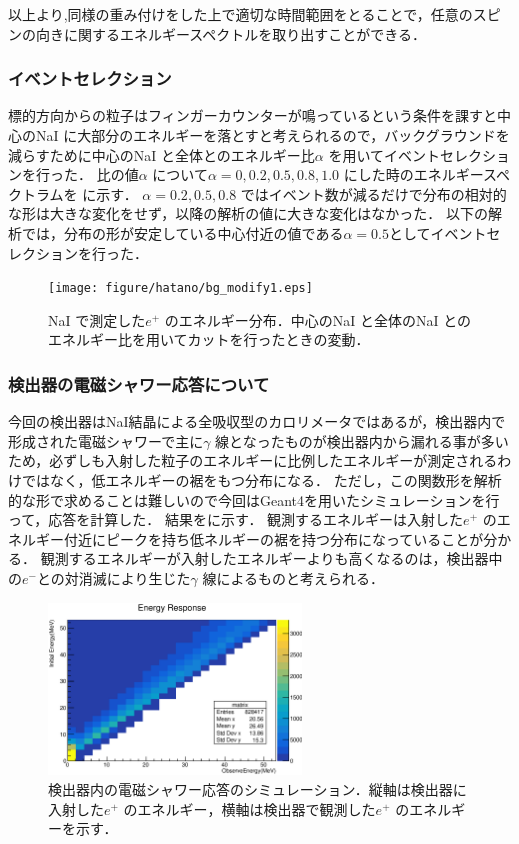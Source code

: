 以上より,同様の重み付けをした上で適切な時間範囲をとることで，任意のスピンの向きに関するエネルギースペクトルを取り出すことができる．

\subsubsection{イベントセレクション}
標的方向からの粒子はフィンガーカウンターが鳴っているという条件を課すと中心のNaI に大部分のエネルギーを落とすと考えられるので，バックグラウンドを減らすために中心のNaI と全体とのエネルギー比$\alpha$ を用いてイベントセレクションを行った．
比の値$\alpha$ について$\alpha=0,0.2,0.5,0.8,1.0$ にした時のエネルギースペクトラムを に示す．
$\alpha=0.2,0.5,0.8$ ではイベント数が減るだけで分布の相対的な形は大きな変化をせず，以降の解析の値に大きな変化はなかった．
以下の解析では，分布の形が安定している中心付近の値である$\alpha=0.5$としてイベントセレクションを行った．
\begin{figure}[hbt]
\centering
\texttt{[image: figure/hatano/bg\_modify1.eps]}
\caption{NaI で測定した$e^+$ のエネルギー分布．中心のNaI と全体のNaI とのエネルギー比を用いてカットを行ったときの変動．}
\label{hatano_fig:bg}
\end{figure}

\subsubsection{検出器の電磁シャワー応答について}
今回の検出器はNaI結晶による全吸収型のカロリメータではあるが，検出器内で形成された電磁シャワーで主に$\gamma$ 線となったものが検出器内から漏れる事が多いため，必ずしも入射した粒子のエネルギーに比例したエネルギーが測定されるわけではなく，低エネルギーの裾をもつ分布になる．
ただし，この関数形を解析的な形で求めることは難しいので今回はGeant4を用いたシミュレーションを行って，応答を計算した．
結果をに示す．
観測するエネルギーは入射した$e^+$ のエネルギー付近にピークを持ち低ネルギーの裾を持つ分布になっていることが分かる．
観測するエネルギーが入射したエネルギーよりも高くなるのは，検出器中の$e^-$との対消滅により生じた$\gamma$ 線によるものと考えられる．

\begin{figure}[hbt]
\centering
\includegraphics[width=0.6\textwidth]{figure/hatano/response.eps}
\caption{検出器内の電磁シャワー応答のシミュレーション．縦軸は検出器に入射した$e^+$ のエネルギー，横軸は検出器で観測した$e^+$ のエネルギーを示す．}
\label{hatano_fig:response}
\end{figure}

